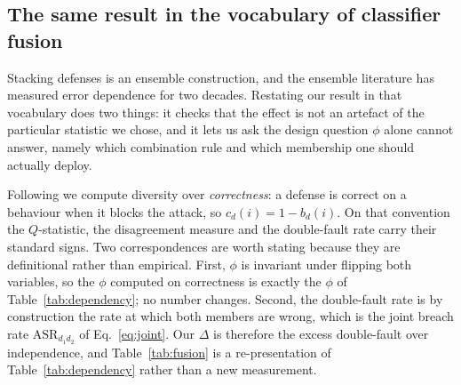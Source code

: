%
%
%

\subsection{The same result in the vocabulary of classifier fusion}
\label{sec:fusion}

Stacking defenses is an ensemble construction, and the ensemble literature has measured
error dependence for two decades. Restating our result in that vocabulary does two things:
it checks that the effect is not an artefact of the particular statistic we chose, and it
lets us ask the design question $\phi$ alone cannot answer, namely which combination rule
and which membership one should actually deploy.

Following \citet{kuncheva2003measures} we compute diversity over \emph{correctness}: a
defense is correct on a behaviour when it blocks the attack, so $c_d(i)=1-b_d(i)$. On that
convention the $Q$-statistic, the disagreement measure and the double-fault rate carry their
standard signs. Two correspondences are worth stating because they are definitional rather
than empirical. First, $\phi$ is invariant under flipping both variables, so the $\phi$
computed on correctness is exactly the $\phi$ of Table~\ref{tab:dependency}; no number
changes. Second, the double-fault rate is by construction the rate at which both members are
wrong, which is the joint breach rate $\mathrm{ASR}_{d_1d_2}$ of Eq.~\eqref{eq:joint}. Our
$\Delta$ is therefore the excess double-fault over independence, and Table~\ref{tab:fusion}
is a re-presentation of Table~\ref{tab:dependency} rather than a new measurement.

